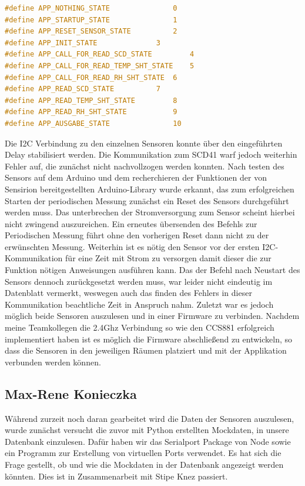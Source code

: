 \documentclass[]{article}
\begin{document}
\begin{lstlisting}[language=C,frame=single, caption = APPSTATE definitions , label = appstate_define] 
#define APP_NOTHING_STATE				0
#define APP_STARTUP_STATE 				1
#define APP_RESET_SENSOR_STATE 			2
#define APP_INIT_STATE 				3
#define APP_CALL_FOR_READ_SCD_STATE 		4
#define APP_CALL_FOR_READ_TEMP_SHT_STATE 	5
#define APP_CALL_FOR_READ_RH_SHT_STATE 	6
#define APP_READ_SCD_STATE 			7
#define APP_READ_TEMP_SHT_STATE 		8
#define APP_READ_RH_SHT_STATE 			9
#define APP_AUSGABE_STATE 				10
\end{lstlisting} 

Die I2C Verbindung zu den einzelnen Sensoren konnte über den eingeführten Delay stabilisiert werden.
Die Kommunikation zum SCD41 warf jedoch weiterhin Fehler auf, die zunächst nicht nachvollzogen werden konnten. Nach testen des Sensors auf dem Arduino und dem recherchieren der Funktionen der von Sensirion bereitgestellten Arduino-Library wurde erkannt, das zum erfolgreichen Starten der periodischen Messung zunächst ein Reset des Sensors durchgeführt werden muss. Das unterbrechen der Stromversorgung zum Sensor scheint hierbei nicht zwingend auszureichen. Ein erneutes übersenden des Befehls zur Periodischen Messung führt ohne den vorherigen Reset dann nicht zu der erwünschten Messung. Weiterhin ist es nötig den Sensor vor der ersten I2C-Kommunikation für eine Zeit mit Strom zu versorgen damit dieser die zur Funktion nötigen Anweisungen ausführen kann. Das der Befehl nach Neustart des Sensors dennoch zurückgesetzt werden muss, war leider nicht eindeutig im Datenblatt vermerkt, weswegen auch das finden des Fehlers in dieser Kommunikation beachtliche Zeit in Anspruch nahm.
Zuletzt war es jedoch möglich beide Sensoren auszulesen und in einer Firmware zu verbinden. Nachdem meine Teamkollegen die 2.4Ghz Verbindung so wie den CCS881 erfolgreich implementiert haben ist es möglich die Firmware abschließend zu entwickeln, so dass die Sensoren in den jeweiligen Räumen platziert und mit der Applikation verbunden werden können. 



\subsection{Max-Rene Konieczka}
Während zurzeit noch daran gearbeitet wird die Daten der Sensoren auszulesen, wurde zunächst versucht die zuvor mit Python erstellten Mockdaten, in unsere Datenbank einzulesen. Dafür haben wir das Serialport Package von Node sowie ein Programm zur Erstellung von virtuellen Ports verwendet. Es hat sich die Frage gestellt, ob und wie die Mockdaten in der Datenbank angezeigt werden könnten. Dies ist in Zusammenarbeit mit Stipe Knez passiert.
\end{document}
